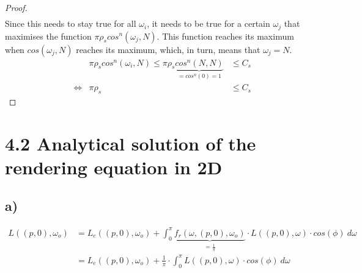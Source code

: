 \documentclass{article}
\begin{document}
\begin{enumerate}[label=(\alph*)]
\begin{proof}
\begin{align}
    \end{align}
    Since this needs to stay true for all $\omega_i$, it needs to be true for a certain $\omega_j$ that maximises the function $\pi \rho_s cos^n({\omega}_j, N)$. This function reaches its maximum when $cos({\omega}_j, N)$ reaches its maximum, which, in turn, means that $\omega_j = N$.
    \begin{align}
        & & \pi \rho_s cos^n({\omega}_i, N) \leq \pi \rho_s \underbrace{cos^n(N, N)}_{=cos^n(0)=1} &\leq C_s\\
        &\Leftrightarrow & \pi \rho_s &\leq C_s
    \end{align}
    \end{proof}
\end{enumerate}






\newpage
\section*{4.2 Analytical solution of the rendering equation in 2D} \label{ex2}
\subsection*{a)}
    \begin{align}
        L((p,0),\omega_o) 
        &= L_e((p,0),\omega_o) + \int_{0}^{\pi} \underbrace{f_r(\omega,(p,0),\omega_o)}_{= \frac{1}{\pi}} \cdot L((p,0),\omega) \cdot cos(\phi)\ d\omega\\
        &= L_e((p,0),\omega_o) + \frac{1}{\pi} \cdot \int_{0}^{\pi} L((p,0),\omega) \cdot cos(\phi)\ d\omega
    \end{align}
    
    
    
    
\end{document}
